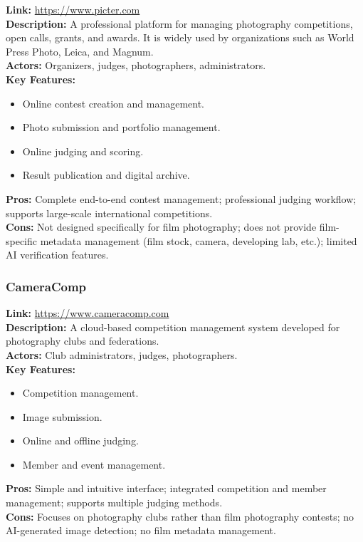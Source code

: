 \textbf{Link:} \url{https://www.picter.com}\\
\textbf{Description:} A professional platform for managing photography competitions, open calls, grants, and awards. It is widely used by organizations such as World Press Photo, Leica, and Magnum.\\
\textbf{Actors:} Organizers, judges, photographers, administrators.\\
\textbf{Key Features:}
\begin{itemize}
    \item Online contest creation and management.
    \item Photo submission and portfolio management.
    \item Online judging and scoring.
    \item Result publication and digital archive.
\end{itemize}
\textbf{Pros:} Complete end-to-end contest management; professional judging workflow; supports large-scale international competitions.\\
\textbf{Cons:} Not designed specifically for film photography; does not provide film-specific metadata management (film stock, camera, developing lab, etc.); limited AI verification features.

\subsubsection{CameraComp}
\label{subsubsec:cameracomp}

\textbf{Link:} \url{https://www.cameracomp.com}\\
\textbf{Description:} A cloud-based competition management system developed for photography clubs and federations.\\
\textbf{Actors:} Club administrators, judges, photographers.\\
\textbf{Key Features:}
\begin{itemize}
    \item Competition management.
    \item Image submission.
    \item Online and offline judging.
    \item Member and event management.
\end{itemize}
\textbf{Pros:} Simple and intuitive interface; integrated competition and member management; supports multiple judging methods.\\
\textbf{Cons:} Focuses on photography clubs rather than film photography contests; no AI-generated image detection; no film metadata management.

